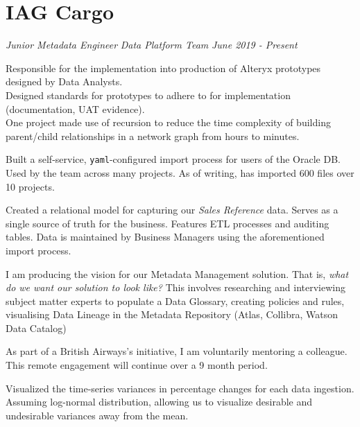 \documentclass[../cv.tex]{subfiles}
\begin{document}
\section{IAG Cargo}
\textit{Junior Metadata Engineer}
\hfill
\textit{Data Platform Team}
\hfill
\textit{June 2019 - Present}
\begin{description}[style=multiline, leftmargin=3.5cm]
	\item[Prototype Implementation]
		  Responsible for the implementation into production of Alteryx prototypes designed by Data Analysts.\\
		  Designed standards for prototypes to adhere to for implementation (documentation, UAT evidence).\\
		  One project made use of recursion to reduce the time complexity of building parent/child relationships in a network graph from hours to minutes.
	\item[Self-Service Data Ingestion\\\textnormal{Python, Powershell}]
	      Built a self-service, \texttt{yaml}-configured import process for users of the Oracle DB. Used by the team across many projects. As of writing, has imported 600 files over 10 projects. \\
	\item[Sales relational model \textnormal{Oracle}] Created a relational model for capturing our \textit{Sales Reference} data. Serves as a single source of truth for the business. Features ETL processes and auditing tables. Data is maintained by Business Managers using the aforementioned import process.
	\item[Metadata Management] I am producing the vision for our Metadata Management solution. That is, \textit{what do we want our solution to look like?} This involves researching and interviewing subject matter experts to populate a Data Glossary, creating policies and rules, visualising  Data Lineage in the Metadata Repository (Atlas, Collibra, Watson Data Catalog)
	\item[Mentoring \textnormal{moving-ahead.org}] As part of a British Airways's initiative, I am voluntarily mentoring a colleague. This remote engagement will continue over a 9 month period.
	\item[Vizualizations\\\textnormal{Tableau}] Visualized the time-series variances in percentage changes for each data ingestion. Assuming log-normal distribution, allowing us to visualize desirable and undesirable variances away from the mean.\\\
\end{description}
\end{document}
